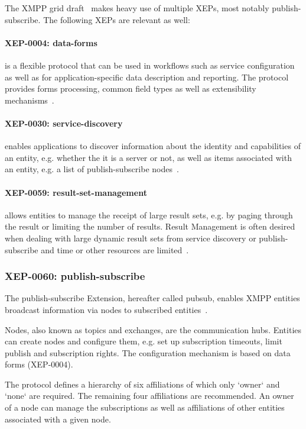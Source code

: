 The XMPP grid draft~\cite{ietf-mile-xmpp-grid-05} makes heavy use of multiple XEPs, most notably \gls{publish-subscribe}. The following XEPs are relevant as well:

\paragraph{XEP-0004: \gls{data-forms}} is a flexible protocol that can be used in workflows such as service configuration as well as for application-specific data description and reporting. The protocol provides forms processing, common field types as well as extensibility mechanisms~\cite{xep-0004}.

\paragraph{XEP-0030: \gls{service-discovery}} enables applications to discover information about the identity and capabilities of an entity, e.g. whether the it is a server or not, as well as items associated with an entity, e.g. a list of \gls{publish-subscribe} nodes~\cite{xep-0030}.

\paragraph{XEP-0059: \Gls{result-set-management}} allows entities to manage the receipt of large result sets, e.g. by paging through the result or limiting the number of results. Result Management is often desired when dealing with large dynamic result sets from service discovery or publish-subscribe and time or other resources are limited~\cite{xep-0059}.

\subsubsection{XEP-0060: \Gls{publish-subscribe}}
The \gls{publish-subscribe} Extension, hereafter called \gls{pubsub}, enables XMPP entities broadcast information via nodes to subscribed entities~\cite{xep-0060}.

Nodes, also known as topics and exchanges, are the communication hubs. Entities can create nodes and configure them, e.g. set up subscription timeouts, limit publish and subscription rights. The configuration mechanism is based on data forms (XEP-0004).

The protocol defines a hierarchy of six affiliations of which only `owner` and `none` are required. The remaining four affiliations are recommended. An owner of a node can manage the subscriptions as well as affiliations of other entities associated with a given node. 

